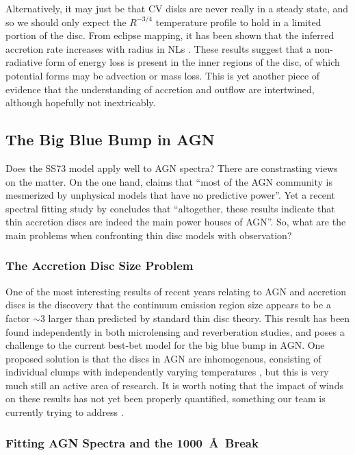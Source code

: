 Alternatively, it may just be that CV disks are never really in
a steady state, and so we should only expect the $R^{-3/4}$
temperature profile to hold in a limited portion of the disc.
From eclipse mapping, it has been shown that the inferred accretion
rate increases with radius in NLs \citep{rutten1992, horne1993}.
These results suggest that a non-radiative form of energy loss
is present in the inner regions of the disc, of which potential forms
may be advection or mass loss. This is yet another piece of evidence
that the understanding of accretion and outflow 
are intertwined, although hopefully not inextricably.

\subsection{The Big Blue Bump in AGN}

Does the SS73 model apply well to AGN spectra? There are constrasting views on the matter.
On the one hand, \cite{antonucci2013} claims that ``most of the AGN community is mesmerized by unphysical models that have no predictive power''. 
Yet a recent spectral fitting study by \cite{capellupo2015} concludes that 
``altogether, these results indicate that thin accretion discs are indeed the 
main power houses of AGN''. So, what are the main problems when 
confronting thin disc models with observation? 

\subsubsection{The Accretion Disc Size Problem}

One of the most interesting results of recent years relating to AGN and accretion discs is
the discovery that the continuum emission region size appears to be
a factor $\sim3$ larger than predicted by standard thin disc theory. This result
has been found independently in both microlensing \citep{morgan2010,dai2010} 
and reverberation \citep{edelson2015} studies, and poses a challenge to the 
current best-bet model for the big blue bump in AGN. 
One proposed solution is that the discs in AGN are inhomogenous,
consisting of individual clumps with independently
varying temperatures \citep{dexteragol2011}, but this is very much
still an active area of research. It is worth noting that the impact
of winds on these results has not yet been properly quantified, something
our team is currently trying to address \citep{mangham}.

\subsubsection{Fitting AGN Spectra and the 1000~\AA\ Break}

